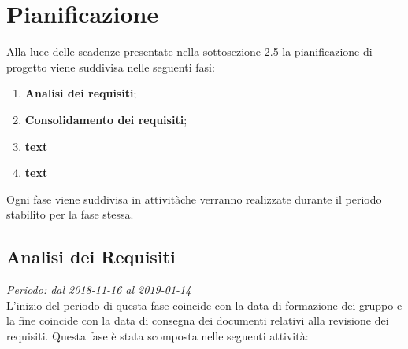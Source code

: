 \section{Pianificazione}
Alla luce delle scadenze presentate nella \hyperlink{scadenze}{sottosezione 2.5} la pianificazione di progetto viene suddivisa nelle seguenti fasi:
\begin{enumerate}
	\item \textbf{Analisi dei requisiti};
	\item \textbf{Consolidamento dei requisiti};
	\item \textbf{text}
	\item \textbf{text}
\end{enumerate}
Ogni fase viene suddivisa in attività\glosp che verranno realizzate durante il 
periodo stabilito per la fase stessa. 
\subsection{Analisi dei Requisiti}
\textit{Periodo: dal 2018-11-16 al 2019-01-14}\\
L'inizio del periodo di questa fase coincide con la data di formazione dei 
gruppo e la fine coincide con la data di consegna dei documenti relativi alla 
revisione dei requisiti. Questa fase è stata scomposta nelle seguenti attività:
